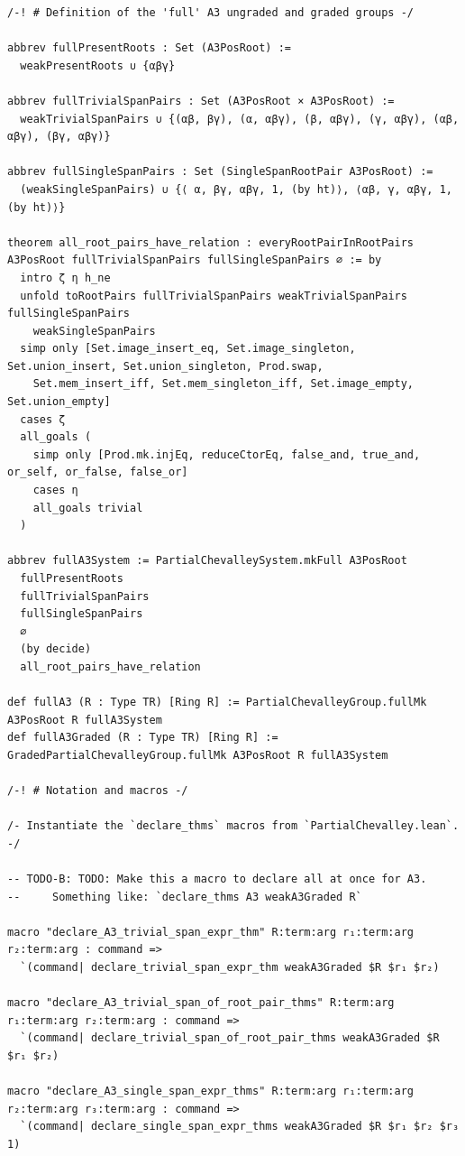 \begin{Verbatim}
/-! # Definition of the 'full' A3 ungraded and graded groups -/

abbrev fullPresentRoots : Set (A3PosRoot) :=
  weakPresentRoots ∪ {αβγ}

abbrev fullTrivialSpanPairs : Set (A3PosRoot × A3PosRoot) :=
  weakTrivialSpanPairs ∪ {(αβ, βγ), (α, αβγ), (β, αβγ), (γ, αβγ), (αβ, αβγ), (βγ, αβγ)}

abbrev fullSingleSpanPairs : Set (SingleSpanRootPair A3PosRoot) :=
  (weakSingleSpanPairs) ∪ {⟨ α, βγ, αβγ, 1, (by ht)⟩, ⟨αβ, γ, αβγ, 1, (by ht)⟩}

theorem all_root_pairs_have_relation : everyRootPairInRootPairs A3PosRoot fullTrivialSpanPairs fullSingleSpanPairs ∅ := by
  intro ζ η h_ne
  unfold toRootPairs fullTrivialSpanPairs weakTrivialSpanPairs fullSingleSpanPairs
    weakSingleSpanPairs
  simp only [Set.image_insert_eq, Set.image_singleton, Set.union_insert, Set.union_singleton, Prod.swap,
    Set.mem_insert_iff, Set.mem_singleton_iff, Set.image_empty, Set.union_empty]
  cases ζ
  all_goals (
    simp only [Prod.mk.injEq, reduceCtorEq, false_and, true_and, or_self, or_false, false_or]
    cases η
    all_goals trivial
  )

abbrev fullA3System := PartialChevalleySystem.mkFull A3PosRoot
  fullPresentRoots
  fullTrivialSpanPairs
  fullSingleSpanPairs
  ∅
  (by decide)
  all_root_pairs_have_relation

def fullA3 (R : Type TR) [Ring R] := PartialChevalleyGroup.fullMk A3PosRoot R fullA3System
def fullA3Graded (R : Type TR) [Ring R] := GradedPartialChevalleyGroup.fullMk A3PosRoot R fullA3System

/-! # Notation and macros -/

/- Instantiate the `declare_thms` macros from `PartialChevalley.lean`. -/

-- TODO-B: TODO: Make this a macro to declare all at once for A3.
--     Something like: `declare_thms A3 weakA3Graded R`

macro "declare_A3_trivial_span_expr_thm" R:term:arg r₁:term:arg r₂:term:arg : command =>
  `(command| declare_trivial_span_expr_thm weakA3Graded $R $r₁ $r₂)

macro "declare_A3_trivial_span_of_root_pair_thms" R:term:arg r₁:term:arg r₂:term:arg : command =>
  `(command| declare_trivial_span_of_root_pair_thms weakA3Graded $R $r₁ $r₂)

macro "declare_A3_single_span_expr_thms" R:term:arg r₁:term:arg r₂:term:arg r₃:term:arg : command =>
  `(command| declare_single_span_expr_thms weakA3Graded $R $r₁ $r₂ $r₃ 1)


\end{Verbatim}

